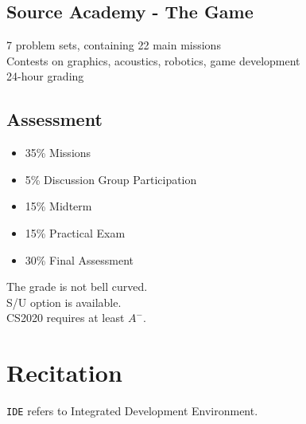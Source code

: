 \documentclass{article}
\begin{document}
\subsection{Source Academy - The Game}
7 problem sets, containing 22 main missions\\
Contests on graphics, acoustics, robotics, game development\\
24-hour grading
\subsection{Assessment}
\begin{itemize}
\item 35\% Missions
\item 5\% Discussion Group Participation
\item 15\% Midterm
\item 15\% Practical Exam
\item 30\% Final Assessment
\end{itemize}
The grade is not bell curved.\\
S/U option is available.\\
CS2020 requires at least $A^{-}$.
\section{Recitation}
\texttt{IDE} refers to Integrated Development Environment.
\end{document}
